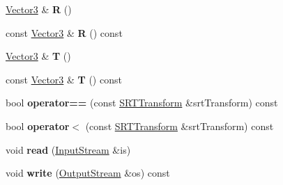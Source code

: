 \begin{DoxyCompactItemize}
\item 
\hyperlink{class_magnum_1_1_vector3}{Vector3} \& {\bfseries R} ()\hypertarget{class_magnum_1_1_s_r_t_transform_a35cfa0d67fdc33c0feeb7f727269fa56}{}\label{class_magnum_1_1_s_r_t_transform_a35cfa0d67fdc33c0feeb7f727269fa56}

\item 
const \hyperlink{class_magnum_1_1_vector3}{Vector3} \& {\bfseries R} () const \hypertarget{class_magnum_1_1_s_r_t_transform_a25aff7e734d22ddeeee3cb5360a47116}{}\label{class_magnum_1_1_s_r_t_transform_a25aff7e734d22ddeeee3cb5360a47116}

\item 
\hyperlink{class_magnum_1_1_vector3}{Vector3} \& {\bfseries T} ()\hypertarget{class_magnum_1_1_s_r_t_transform_a65e17fbd33cb21d92faed7a1f793d5d6}{}\label{class_magnum_1_1_s_r_t_transform_a65e17fbd33cb21d92faed7a1f793d5d6}

\item 
const \hyperlink{class_magnum_1_1_vector3}{Vector3} \& {\bfseries T} () const \hypertarget{class_magnum_1_1_s_r_t_transform_a696f83a07e18633e9ff596d6c618298f}{}\label{class_magnum_1_1_s_r_t_transform_a696f83a07e18633e9ff596d6c618298f}

\item 
bool {\bfseries operator==} (const \hyperlink{class_magnum_1_1_s_r_t_transform}{S\+R\+T\+Transform} \&srt\+Transform) const \hypertarget{class_magnum_1_1_s_r_t_transform_a6e2f756d5c299def7736e2b35e9e2ebe}{}\label{class_magnum_1_1_s_r_t_transform_a6e2f756d5c299def7736e2b35e9e2ebe}

\item 
bool {\bfseries operator$<$} (const \hyperlink{class_magnum_1_1_s_r_t_transform}{S\+R\+T\+Transform} \&srt\+Transform) const \hypertarget{class_magnum_1_1_s_r_t_transform_a6e7544b89b4c8a1731cb61159cc26390}{}\label{class_magnum_1_1_s_r_t_transform_a6e7544b89b4c8a1731cb61159cc26390}

\item 
void {\bfseries read} (\hyperlink{class_magnum_1_1_input_stream}{Input\+Stream} \&is)\hypertarget{class_magnum_1_1_s_r_t_transform_a453043db8543fa9d785d95e9a600e613}{}\label{class_magnum_1_1_s_r_t_transform_a453043db8543fa9d785d95e9a600e613}

\item 
void {\bfseries write} (\hyperlink{class_magnum_1_1_output_stream}{Output\+Stream} \&os) const \hypertarget{class_magnum_1_1_s_r_t_transform_a185ab9a35807408856a490f7f8d1b679}{}\label{class_magnum_1_1_s_r_t_transform_a185ab9a35807408856a490f7f8d1b679}

\end{DoxyCompactItemize}
